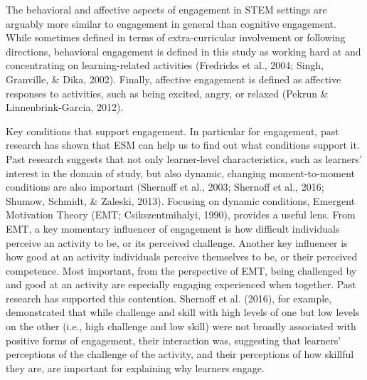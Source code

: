 \documentclass[]{msu-thesis}
\theoremstyle{definition}
\theoremstyle{definition}
\theoremstyle{definition}
\theoremstyle{remark}
\begin{document}
The behavioral and affective aspects of engagement in STEM settings are
arguably more similar to engagement in general than cognitive
engagement. While sometimes defined in terms of extra-curricular
involvement or following directions, behavioral engagement is defined in
this study as working hard at and concentrating on learning-related
activities (Fredricks et al., 2004; Singh, Granville, \& Dika, 2002).
Finally, affective engagement is defined as affective responses to
activities, such as being excited, angry, or relaxed (Pekrun \&
Linnenbrink-Garcia, 2012).

Key conditions that support engagement. In particular for engagement,
past research has shown that ESM can help us to find out what conditions
support it. Past research suggests that not only learner-level
characteristics, such as learners' interest in the domain of study, but
also dynamic, changing moment-to-moment conditions are also important
(Shernoff et al., 2003; Shernoff et al., 2016; Shumow, Schmidt, \&
Zaleski, 2013). Focusing on dynamic conditions, Emergent Motivation
Theory (EMT; Csikszentmihalyi, 1990), provides a useful lens. From EMT,
a key momentary influencer of engagement is how difficult individuals
perceive an activity to be, or its perceived challenge. Another key
influencer is how good at an activity individuals perceive themselves to
be, or their perceived competence. Most important, from the perspective
of EMT, being challenged by and good at an activity are especially
engaging experienced when together. Past research has supported this
contention. Shernoff et al. (2016), for example, demonstrated that while
challenge and skill with high levels of one but low levels on the other
(i.e., high challenge and low skill) were not broadly associated with
positive forms of engagement, their interaction was, suggesting that
learners' perceptions of the challenge of the activity, and their
perceptions of how skillful they are, are important for explaining why
learners engage.
\end{document}
